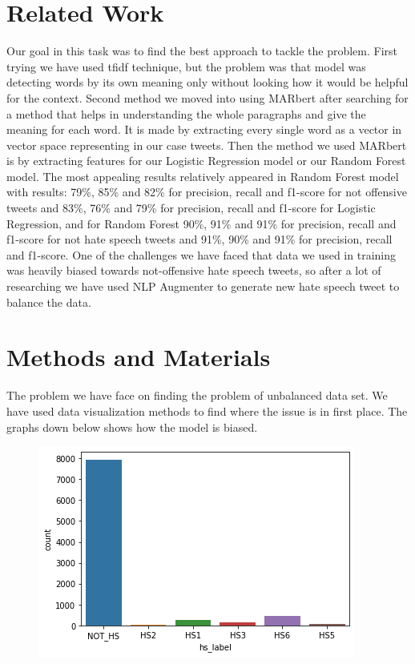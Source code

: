 \documentclass{IEEEtran}
\begin{document}
\section{Related Work}
Our goal in this task was to find the best approach to tackle the problem. First trying we have used tfidf technique, but the problem was that model was detecting words by its own meaning only without looking how it would be helpful for the context. Second method we moved into using MARbert after searching for a method that helps in understanding the whole paragraphs and give the meaning for each word. It is made by extracting every single word as a vector in vector space representing in our case tweets. Then the method we used MARbert is by extracting features for our Logistic Regression model or our Random Forest model. The most appealing results relatively appeared in Random Forest model with results: 79\%, 85\% and 82\% for precision, recall and f1-score for not offensive tweets and 83\%, 76\% and 79\% for precision, recall and f1-score for Logistic Regression, and for Random Forest 90\%, 91\% and 91\% for precision, recall and f1-score for not hate speech tweets and 91\%, 90\% and 91\% for precision, recall and f1-score. One of the challenges we have faced that data we used in training was heavily biased towards not-offensive hate speech tweets, so after a lot of researching we have used NLP Augmenter to generate new hate speech tweet to balance the data.


\section{Methods and Materials}
The problem we have face on finding the problem of unbalanced data set. We have used data visualization methods to find where the issue is in first place. The graphs down below shows how the model is biased.

\begin{figure}[htbp]
	\includegraphics[width=\columnwidth, height=0.30\paperwidth]{02.png}
\end{figure}
\end{document}
